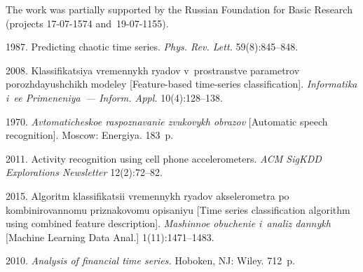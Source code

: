         



\vspace*{-14pt}

\Ack
\noindent
The work was partially supported by the Russian Foundation for Basic Research 
(projects 17-07-1574 and~19-07-1155).



\vspace*{6pt}

  \begin{multicols}{2}

\renewcommand{\bibname}{\protect\rmfamily References}

{\small\frenchspacing
 {%
 \begin{thebibliography}{99}
 
1987. Predicting chaotic time series. \textit{Phys. Rev. Lett.} 59(8):845--848.

2008. Klassifikatsiya vremennykh ryadov v~prostranstve 
parametrov porozhdayushchikh modeley 
[Feature-based time-series classification].
 \textit{Informatika i~ee Primeneniya~--- Inform. Appl.} 10(4):128--138.





 1970. \textit{Avtomaticheskoe 
raspoznavanie zvukovykh obrazov} [Automatic speech recognition]. 
Moscow: Energiya. 183~p.

 2011. Activity recognition using cell phone accelerometers. 
 \textit{ACM SigKDD Explorations Newsletter} 12(2):72--82.

 2015. Algoritm klassifikatsii 
vremennykh ryadov akselerometra po kombinirovannomu priznakovomu opisaniyu 
[Time series classification algorithm using combined feature description]. 
\textit{Mashinnoe obuchenie i~analiz dannykh} 
[{Machine Learning Data Anal.}] 1(11):1471--1483.

 2010. \textit{Analysis of financial time series.} 
Hoboken, NJ: {Wiley.} 712~p.




\end{thebibliography}}}
\end{multicols}
